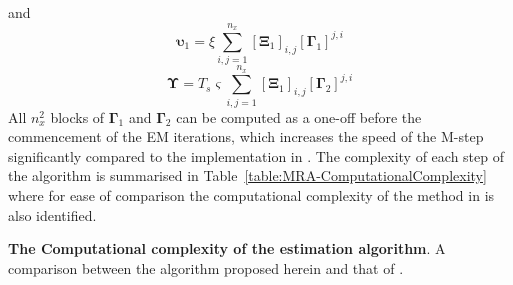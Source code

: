 \documentclass[11pt,draftcls,onecolumn,peerreview]{IEEEtran}
\begin{document}
and
\begin{equation}\label{eq:epsilon1}
\boldsymbol\upsilon_1=\xi\sum_{i,j=1}^{n_x}[\boldsymbol\Xi_1]_{i,j}[\boldsymbol\Gamma_1]^{j,i}
\end{equation}
\begin{equation}\label{eq:Epsilon}
\boldsymbol\Upsilon=T_s\varsigma\sum_{i,j=1}^{n_x}[\boldsymbol\Xi_1]_{i,j}[\boldsymbol\Gamma_2]^{j,i}
\end{equation}
All $n_x^2$ blocks of $\boldsymbol\Gamma_1$ and $\boldsymbol\Gamma_2$  can be computed as a one-off before the commencement of the EM iterations, which increases the speed of the M-step significantly compared to the implementation in \cite{Dewar2009}. The complexity of each step of the algorithm is summarised in Table~\ref{table:MRA-ComputationalComplexity} where for ease of comparison the computational complexity of the method in \cite{Dewar2009} is also identified.
\begin {table}
\begin{center}
 \caption {{\bf The Computational complexity of the estimation algorithm}. A comparison between the algorithm proposed herein and that of \cite{Dewar2009}.} 
\label{table:MRA-ComputationalComplexity}
\end{center}
\end {table}
\end{document}
